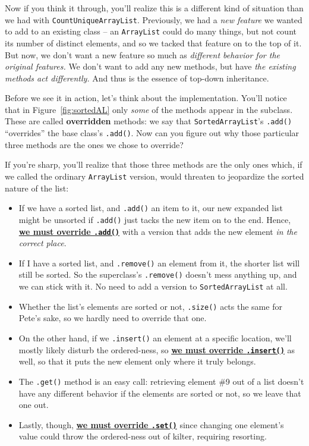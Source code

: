 Now if you think it through, you'll realize this is a different kind of
situation than we had with \texttt{CountUniqueArrayList}. Previously, we had a
\textit{new feature} we wanted to add to an existing class -- an
\texttt{ArrayList} could do many things, but not count its number of distinct
elements, and so we tacked that feature on to the top of it. But now, we don't
want a new feature so much as \textit{different behavior for the original
features.} We don't want to add any new methods, but have \textit{the existing
methods act differently.} And thus is the essence of top-down inheritance.

Before we see it in action, let's think about the implementation. You'll
notice that in Figure~\ref{fig:sortedAL} only \textit{some} of the methods
appear in the subclass. These are called \textbf{overridden} methods: we say
that \texttt{SortedArrayList}'s \texttt{.add()} ``overrides'' the base class's
\texttt{.add()}. Now can you figure out why those particular three methods are
the ones we chose to override?

If you're sharp, you'll realize that those three methods are the only ones
which, if we called the ordinary \texttt{ArrayList} version, would threaten to
jeopardize the sorted nature of the list:

\begin{itemize}
\itemsep.1em

\item If we have a sorted list, and \texttt{.add()} an item to it, our new
expanded list might be unsorted if \texttt{.add()} just tacks the new item on
to the end. Hence, \underline{\textbf{we must override \texttt{.add()}}} with
a version that adds the new element \textit{in the correct place}.

\item If I have a sorted list, and \texttt{.remove()} an element from it, the
shorter list will still be sorted. So the superclass's \texttt{.remove()}
doesn't mess anything up, and we can stick with it. No need to add a version
to \texttt{SortedArrayList} at all.

\item Whether the list's elements are sorted or not, \texttt{.size()} acts the
same for Pete's sake, so we hardly need to override that one.

\item On the other hand, if we \texttt{.insert()} an element at a specific
location, we'll mostly likely disturb the ordered-ness, so
\underline{\textbf{we must override \texttt{.insert()}}} as well, so that it
puts the new element only where it truly belongs.

\item The \texttt{.get()} method is an easy call: retrieving element \#9 out
of a list doesn't have any different behavior if the elements are sorted or
not, so we leave that one out.

\item Lastly, though, \underline{\textbf{we must override \texttt{.set()}}}
since changing one element's value could throw the ordered-ness out of kilter,
requiring resorting.

\end{itemize}

